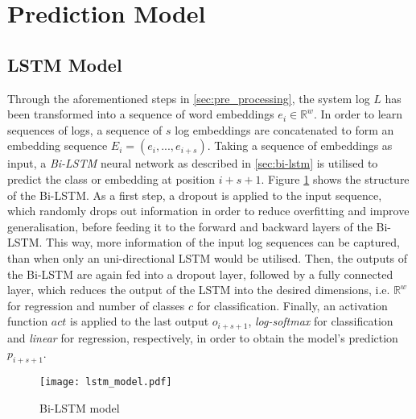 \section{Prediction Model\label{sec:prediction_model}}

\subsection{LSTM Model\label{sec:lstm-model}}
Through the aforementioned steps in \ref{sec:pre_processing}, the system log $L$ has been transformed into a sequence of word embeddings $e_i \in \mathbb{R}^w$. In order to learn sequences of logs, a sequence of $s$ log embeddings are concatenated to form an embedding sequence $E_i = (e_i,...,e_{i+s})$. Taking a sequence of embeddings as input, a \textit{Bi-LSTM} neural network as described in \ref{sec:bi-lstm} is utilised to predict the class or embedding at position $i+s+1$. Figure \ref{fig:lstm_model} shows the structure of the Bi-LSTM. As a first step, a dropout is applied to the input sequence, which randomly drops out information in order to reduce overfitting and improve generalisation, before feeding it to the forward and backward layers of the Bi-LSTM. This way, more information of the input log sequences can be captured, than when only an uni-directional LSTM would be utilised. Then, the outputs of the Bi-LSTM are again fed into a dropout layer, followed by a fully connected layer, which reduces the output of the LSTM into the desired dimensions, i.e. $\mathbb{R}^w$ for regression and number of classes $c$ for classification. Finally, an activation function $act$ is applied to the last output $o_{i+s+1}$, \textit{log-softmax} for classification and \textit{linear} for regression, respectively, in order to obtain the model's prediction $p_{i+s+1}$.


\begin{figure}[H]
	\centering	
	\texttt{[image: lstm\_model.pdf]}
	\caption{Bi-LSTM model}
	\label{fig:lstm_model}
\end{figure}
\newpage
